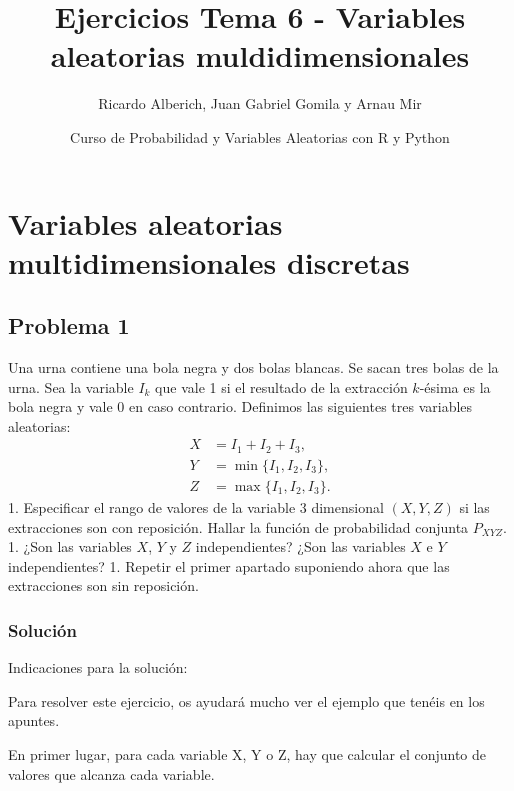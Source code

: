 \documentclass[
]{article}
\title{Ejercicios Tema 6 - Variables aleatorias muldidimensionales}
\author{Ricardo Alberich, Juan Gabriel Gomila y Arnau Mir}
\date{Curso de Probabilidad y Variables Aleatorias con R y Python}
\begin{document}
\maketitle

{
\hypersetup{linkcolor=blue}
\setcounter{tocdepth}{2}
\tableofcontents
}
\newcommand\momento{m}
\newcommand{\momentocentral}{\mu}
\newcommand{\FunGenMom}{m}
\newcommand{\FunCar}{\phi}

\hypertarget{variables-aleatorias-multidimensionales-discretas}{%
\section{Variables aleatorias multidimensionales
discretas}\label{variables-aleatorias-multidimensionales-discretas}}

\hypertarget{problema-1}{%
\subsection{Problema 1}\label{problema-1}}

Una urna contiene una bola negra y dos bolas blancas. Se sacan tres
bolas de la urna. Sea la variable \(I_k\) que vale 1 si el resultado de
la extracción \(k\)-ésima es la bola negra y vale 0 en caso contrario.
Definimos las siguientes tres variables aleatorias: \[
\begin{array}{rl}
X & = I_1+I_2+I_3, \\
Y & = \min\{I_1,I_2,I_3\},\\
Z & = \max\{I_1,I_2,I_3\}.
\end{array}
\] 1. Especificar el rango de valores de la variable \(3\) dimensional
\((X,Y,Z)\) si las extracciones son con reposición. Hallar la función de
probabilidad conjunta \(P_{XYZ}\). 1. ¿Son las variables \(X\), \(Y\) y
\(Z\) independientes? ¿Son las variables \(X\) e \(Y\) independientes?
1. Repetir el primer apartado suponiendo ahora que las extracciones son
sin reposición.

\hypertarget{soluciuxf3n}{%
\subsubsection{Solución}\label{soluciuxf3n}}

Indicaciones para la solución:

Para resolver este ejercicio, os ayudará mucho ver el ejemplo que tenéis
en los apuntes.

En primer lugar, para cada variable X, Y o Z, hay que calcular el
conjunto de valores que alcanza cada variable.
\end{document}

